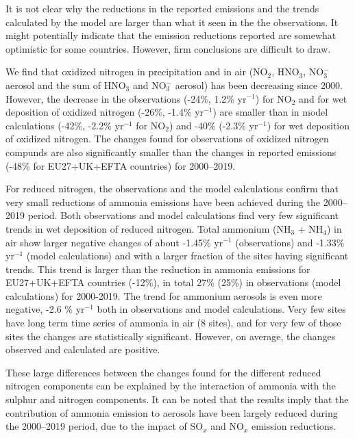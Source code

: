 It is not clear why the reductions in the reported emissions and the trends calculated by the model are larger than what it seen in the the observations. It might potentially indicate that the emission reductions reported are somewhat optimistic for some countries. However, firm conclusions are difficult to draw.

We find that oxidized nitrogen in precipitation and in air (NO$_2$, HNO$_3$, NO$_3^{-}$ aerosol and the sum of HNO$_3$ and NO$_3^{-}$ aerosol) has been decreasing since 2000. However, the decrease in the observations (-24\%, 1.2\% yr$^{-1}$) for NO$_2$ and for wet deposition of oxidized nitrogen (-26\%, -1.4\% yr$^{-1}$) are smaller than in model calculations (-42\%, -2.2\% yr$^{-1}$ for NO$_2$) and -40\% (-2.3\% yr$^{-1}$) for wet deposition of oxidized nitrogen. The changes found for observations of oxidized nitrogen compunds are also significantly smaller than the changes in reported emissions (-48\% for EU27+UK+EFTA countries) for 2000--2019.

For reduced nitrogen, the observations and the model calculations confirm that very small reductions of ammonia emissions have been achieved during the 2000--2019 period. 
Both observations and model calculations find very few significant trends in wet deposition of reduced nitrogen.
Total ammonium (NH$_3$ + NH$_4$) in air show larger negative changes of about -1.45\% yr$^{-1}$ (observations) and -1.33\% yr$^{-1}$ (model calculations) and with a larger fraction of the sites having significant trends. This trend is larger than the reduction in ammonia emissions for EU27+UK+EFTA countries (-12\%), in total 27\% (25\%) in observations (model calculations) for 2000-2019. The trend for ammonium aerosols is even more negative, -2.6 \% yr$^{-1}$ both in observations and model calculations. Very few sites have long term time series of ammonia in air (8 sites), and for very few of those sites the changes are statistically significant. However, on average, the changes observed and calculated are positive. 

These large differences between the changes found for the different reduced nitrogen components can be explained by the interaction of ammonia with the sulphur and nitrogen components. It can be noted that the results imply that the contribution of ammonia emission to aerosols have been largely reduced during the 2000--2019 period, due to the impact of SO$_x$ and NO$_x$ emission reductions. 




